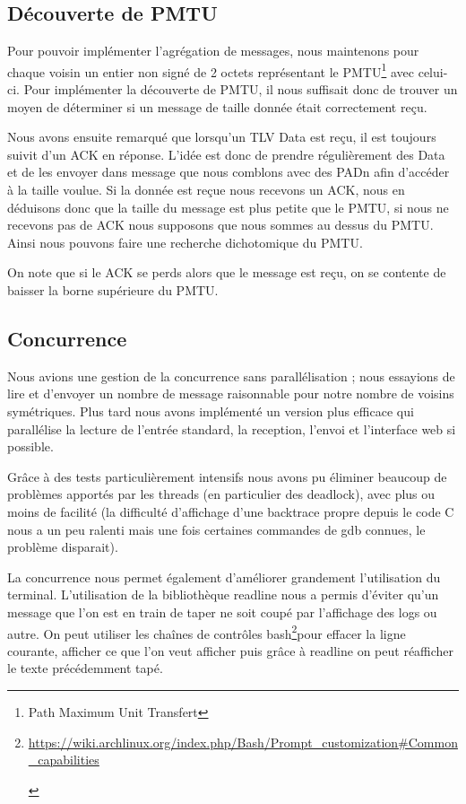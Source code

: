 \documentclass[a4paper,10pt]{article} %
\let\urlorig\url
\renewcommand{\url}[1]{\begin{otherlanguage}{english}\urlorig{#1}\end{otherlanguage}}
\begin{document}
\subsection{Découverte de PMTU\label{sec:pmtu}}

Pour pouvoir implémenter l'agrégation de messages, nous maintenons pour chaque voisin un entier non signé de 2 octets représentant le \textrm{PMTU}\footnote{Path Maximum Unit Transfert} avec celui-ci. Pour implémenter la découverte de \textrm{PMTU}, il nous suffisait donc de trouver un moyen de déterminer si un message de taille donnée était correctement reçu.

Nous avons ensuite remarqué que lorsqu'un TLV Data est reçu, il est toujours suivit d'un ACK en réponse. L'idée est donc de prendre régulièrement des Data et de les envoyer dans message que nous comblons avec des PADn afin d’accéder à la taille voulue. Si la donnée est reçue nous recevons un ACK, nous en déduisons donc que la taille du message est plus petite que le \textrm{PMTU}, si nous ne recevons pas de ACK nous supposons que nous sommes au dessus du \textrm{PMTU}. Ainsi nous pouvons faire une recherche dichotomique du PMTU.

On note que si le ACK se perds alors que le message est reçu, on se contente de baisser la borne supérieure du PMTU.

\subsection{Concurrence}
Nous avions une gestion de la concurrence sans parallélisation ; nous essayions de lire et d'envoyer un nombre de message raisonnable pour notre nombre de voisins symétriques. Plus tard nous avons implémenté un version plus efficace qui parallélise la lecture de l'entrée standard, la reception, l'envoi et l'interface web si possible.

Grâce à des tests particulièrement intensifs nous avons pu éliminer beaucoup de problèmes apportés par les threads (en particulier des deadlock), avec plus ou moins de facilité (la difficulté d'affichage d'une backtrace propre depuis le code C nous a un peu ralenti mais une fois certaines commandes de gdb connues, le problème disparait).

La concurrence nous permet également d'améliorer grandement l'utilisation du terminal. L'utilisation de la bibliothèque readline nous a permis d'éviter qu'un message que l'on est en train de taper ne soit coupé par l'affichage des logs ou autre. On peut utiliser les chaînes de contrôles bash\footnote{\url{https://wiki.archlinux.org/index.php/Bash/Prompt\_customization\#Common\_capabilities}}pour effacer la ligne courante, afficher ce que l'on veut afficher puis grâce à readline on peut réafficher le texte précédemment tapé.
\end{document}
